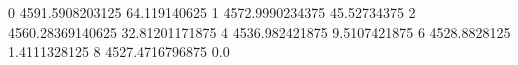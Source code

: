 0 4591.5908203125 64.119140625
1 4572.9990234375 45.52734375
2 4560.28369140625 32.81201171875
4 4536.982421875 9.5107421875
6 4528.8828125 1.4111328125
8 4527.4716796875 0.0
